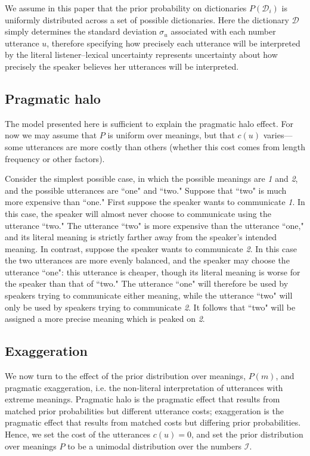 \documentclass{article} %
\newcommand{\dictionary}{\ensuremath{\mathcal{D}}\xspace}
\begin{document}
We assume in this paper that the prior probability on dictionaries $P(\dictionary_i)$ is uniformly distributed across a set of possible dictionaries. 
Here the dictionary $\dictionary$ simply determines the standard deviation $\sigma_u$ associated with each number utterance $u$, therefore specifying how precisely each utterance will be interpreted by the literal listener--lexical uncertainty represents uncertainty about how precisely the speaker believes her utterances will be interpreted. 


\subsection{Pragmatic halo}

The model presented here is sufficient to explain the pragmatic halo effect. For now we may assume that $P$ is uniform over meanings, but that $c(u)$ varies---some utterances are more costly than others (whether this cost comes from length frequency or other factors).

 Consider the simplest possible case, in which the possible meanings are \emph{1} and \emph{2}, and the possible utterances are ``one" and ``two." Suppose that ``two" is much more expensive than ``one." First suppose the speaker wants to communicate \emph{1}. In this case, the speaker will almost never choose to communicate using the utterance ``two." The utterance ``two" is more expensive than the utterance ``one," and its literal meaning is strictly farther away from the speaker's intended meaning. In contrast, suppose the speaker wants to communicate \emph{2}. In this case the two utterances are more evenly balanced, and the speaker may choose the utterance ``one": this utterance is cheaper, though its literal meaning is worse for the speaker than that of ``two." The utterance ``one" will therefore be used by speakers trying to communicate either meaning, while the utterance ``two" will only be used by speakers trying to communicate \emph{2}. It follows that ``two" will be assigned a more precise meaning which is peaked on \emph{2}. 

\subsection{Exaggeration}

We now turn to the effect of the prior distribution over meanings, $P(m)$, and pragmatic exaggeration, i.e. the non-literal interpretation of utterances with extreme meanings. 
Pragmatic halo is the pragmatic effect that results from matched prior probabilities but different utterance costs; exaggeration is the pragmatic effect that results from matched costs but differing prior probabilities. 
Hence, we set the cost of the utterances $c(u)=0$, and set the prior distribution over meanings $P$ to be a unimodal distribution over the numbers $\mathcal I$. 
\end{document}
